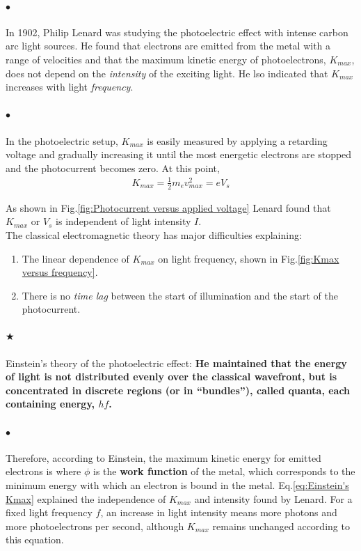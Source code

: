     \paragraph{$\bullet$} In 1902,  Philip Lenard was studying the photoelectric effect with 
    intense carbon arc light sources. He found that electrons are emitted from the metal with a range of 
    velocities and that the maximum kinetic energy of photoelectrons, $K_{max}$, does not depend on the 
    \textit{intensity} of the exciting light. He lso indicated that $K_{max}$ increases with light \textit{frequency}.

    \paragraph{$\bullet$} In the photoelectric setup, $K_{max}$ is easily measured by applying a retarding voltage and gradually 
    increasing it until the most energetic electrons are stopped and the photocurrent becomes zero. At this point,
    \begin{align}
        \label{eq:Kmax of a photoelectron}
        K_{max} = \frac{1}{2} m_e v^2_{max} = eV_s
    \end{align}
    
    As shown in Fig.\eqref{fig:Photocurrent versus applied voltage} Lenard found that 
    $K_{max}$ or $V_s$ is independent of light intensity $I$.\\
    The classical electromagnetic theory has major difficulties explaining:
    \begin{enumerate}
        \item The linear dependence of  $K_{max}$ on light frequency, shown in Fig.\eqref{fig:Kmax versus frequency}.
        \item There is no \textit{time lag} between the start of illumination and the start of the photocurrent.
    \end{enumerate}

    \paragraph{$\bigstar$} Einstein’s theory of the photoelectric effect:
    \textbf{\color{c3}
    He maintained that the energy of light is not distributed evenly over the classical wavefront, 
    but is concentrated in discrete regions (or in “bundles”), called quanta, each containing energy, $hf$.}

    \paragraph{$\bullet$} Therefore, according to Einstein, the maximum kinetic energy for emitted electrons is
    where $\phi$ is the \textbf{work function} of the metal, which corresponds to the minimum energy 
    with which an electron is bound in the metal.
    Eq.\eqref{eq:Einstein's Kmax} explained the independence of $K_{max}$ and intensity found by Lenard. 
    For a fixed light frequency $f$, an increase in light intensity means more photons and more photoelectrons 
    per second, although $K_{max}$ remains unchanged according to this equation.

